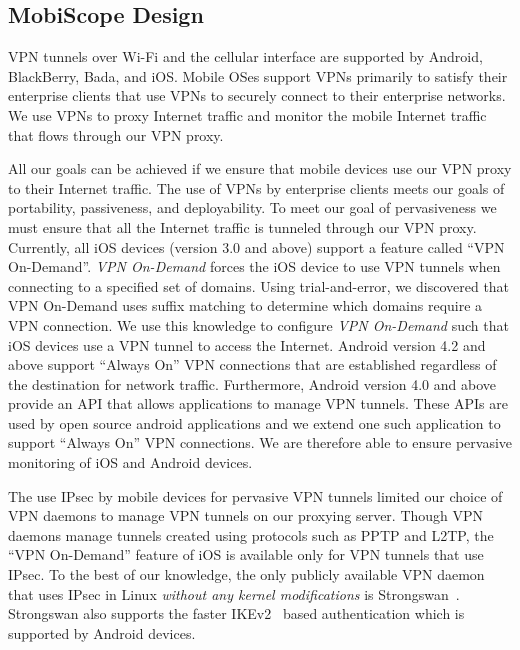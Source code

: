 \subsection{MobiScope Design}



VPN tunnels over Wi-Fi and the cellular interface are supported by
Android, BlackBerry, Bada, and iOS.  Mobile OSes support VPNs
primarily to satisfy their enterprise clients that use VPNs to
securely connect to their enterprise networks.  We use VPNs to proxy
Internet traffic and monitor the mobile Internet traffic that flows
through our VPN proxy.

All our goals can be achieved if we ensure that mobile devices use our
VPN proxy to their Internet traffic.  The use of VPNs by enterprise
clients meets our goals of portability, passiveness, and
deployability.  To meet our goal of pervasiveness we must ensure that
all the Internet traffic is tunneled through our VPN proxy.
Currently, all iOS devices (version 3.0 and above) support a feature
called ``VPN On-Demand''.  \emph{VPN On-Demand} forces the iOS device
to use VPN tunnels when connecting to a specified set of domains.
Using trial-and-error, we discovered that VPN On-Demand uses suffix
matching to determine which domains require a VPN connection.  We use
this knowledge to configure \emph{VPN On-Demand} such that iOS devices
use a VPN tunnel to access the Internet.  Android version 4.2 and
above support ``Always On'' VPN connections that are established
regardless of the destination for network traffic.  Furthermore,
Android version 4.0 and above provide an API that allows applications
to manage VPN tunnels.  These APIs are used by open source android
applications and we extend one such application to support ``Always
On'' VPN connections. We are therefore able to ensure pervasive
monitoring of iOS and Android devices.

The use IPsec by mobile devices for pervasive VPN tunnels limited our
choice of VPN daemons to manage VPN tunnels on our proxying server.
Though VPN daemons manage tunnels created using protocols such as PPTP
and L2TP, the ``VPN On-Demand'' feature of iOS is available only for
VPN tunnels that use IPsec.  To the best of our knowledge, the only
publicly available VPN daemon that uses IPsec in Linux \emph{without
  any kernel modifications} is Strongswan~\cite{strongswan}.
Strongswan also supports the faster IKEv2~\cite{rfc5996} based
authentication which is supported by Android devices.

